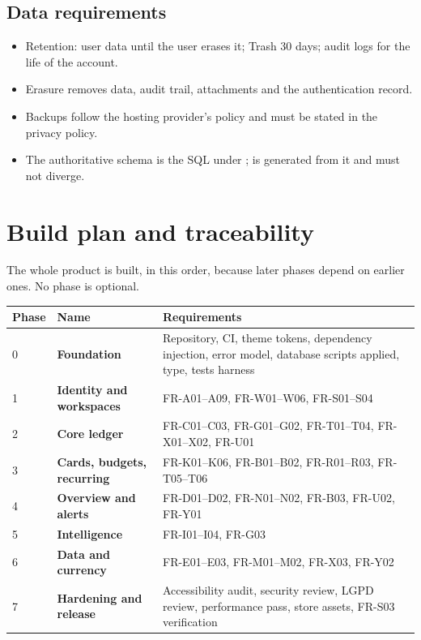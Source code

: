 \documentclass[11pt,a4paper]{article}
\newcommand{\code}[1]{\texttt{\detokenize{#1}}}
\begin{document}
\subsection{Data requirements}
\begin{itemize}
  \item Retention: user data until the user erases it; Trash 30 days; audit logs for the life of the account.
  \item Erasure removes data, audit trail, attachments and the authentication record.
  \item Backups follow the hosting provider's policy and must be stated in the privacy policy.
  \item The authoritative schema is the SQL under \code{sql/}; \code{DATABASE.md} is generated from it and must not diverge.
\end{itemize}

\section{Build plan and traceability}\label{sec:plan}
The whole product is built, in this order, because later phases depend on earlier ones. No phase is optional.

\begin{tabularx}{\textwidth}{@{}l >{\bfseries}l X@{}}
\toprule
\textbf{Phase} & \textbf{Name} & \textbf{Requirements} \\
\midrule
0 & Foundation & Repository, CI, theme tokens, dependency injection, error model, database scripts applied, \code{Money} type, tests harness \\
1 & Identity and workspaces & FR-A01--A09, FR-W01--W06, FR-S01--S04 \\
2 & Core ledger & FR-C01--C03, FR-G01--G02, FR-T01--T04, FR-X01--X02, FR-U01 \\
3 & Cards, budgets, recurring & FR-K01--K06, FR-B01--B02, FR-R01--R03, FR-T05--T06 \\
4 & Overview and alerts & FR-D01--D02, FR-N01--N02, FR-B03, FR-U02, FR-Y01 \\
5 & Intelligence & FR-I01--I04, FR-G03 \\
6 & Data and currency & FR-E01--E03, FR-M01--M02, FR-X03, FR-Y02 \\
7 & Hardening and release & Accessibility audit, security review, LGPD review, performance pass, store assets, FR-S03 verification \\
\bottomrule
\end{tabularx}
\end{document}
